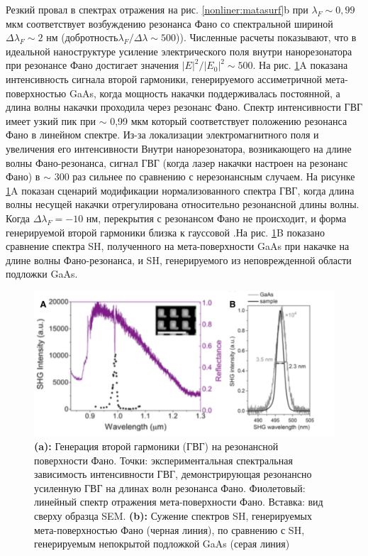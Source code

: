 Резкий провал в спектрах отражения на рис. \ref{nonliner:matasurf}b при $\lambda_{F} \sim0,99$  мкм соответствует возбуждению резонанса Фано со спектральной шириной $\Delta\lambda_{F} \sim 2$ нм (добротность$\lambda_{F} /\Delta\lambda \sim 500$)). Численные расчеты показывают, что в идеальной наноструктуре усиление электрического поля внутри нанорезонатора при резонансе Фано достигает значения $|E|^2/|E_{0}|^2 \sim 500$. На рис. \ref{nonliner:matasurf2}A показана интенсивность сигнала второй гармоники, генерируемого  ассиметричной мета-поверхностью GaAs, когда мощность накачки поддерживалась постоянной, а длина волны накачки проходила через резонанс Фано. Спектр интенсивности ГВГ имеет узкий пик при $\sim$ 0,99 мкм который соответствует положению резонанса Фано в линейном спектре. Из-за локализации электромагнитного поля и увеличения его интенсивности Внутри нанорезонатора, возникающего на длине волны Фано-резонанса, сигнал ГВГ  (когда лазер накачки настроен на резонанс Фано) в  $\sim$ 300 раз сильнее по сравнению с нерезонансным случаем. На рисунке \ref{nonliner:matasurf2}A показан сценарий модификации нормализованного спектра ГВГ, когда длина волны несущей накачки отрегулирована относительно резонансной длины волны. Когда $\Delta\lambda_{F} = -10$ нм, перекрытия с резонансом Фано не происходит, и форма генерируемой второй гармоники близка к гауссовой .На рис. \ref{nonliner:matasurf2}B показано сравнение спектра SH, полученного на мета-поверхности GaAs при накачке на длине волны Фано-резонанса, и SH, генерируемого из неповрежденной области подложки GaAs. 
 \begin{figure}[h!]
	\centering
	\includegraphics[width=0.7\linewidth]{images/fig7.png}
	\caption{\textbf{(a): }Генерация второй гармоники (ГВГ) на резонансной поверхности Фано. Точки: экспериментальная спектральная зависимость интенсивности ГВГ, демонстрирующая резонансно усиленную ГВГ на длинах волн резонанса Фано. Фиолетовый: линейный спектр отражения мета-поверхности Фано. Вставка: вид сверху образца SEM. \textbf{(b):} Сужение спектров SH, генерируемых мета-поверхностью Фано (черная линия), по сравнению с SH, генерируемым непокрытой подложкой GaAs (серая линия)}
	\label{nonliner:matasurf2}
\end{figure}


